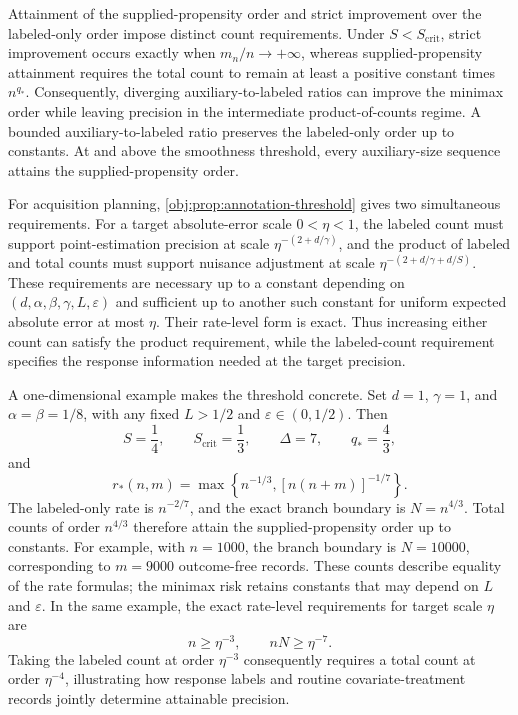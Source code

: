 \documentclass[11pt]{article}
\begin{document}
Attainment of the supplied-propensity order and strict improvement over the labeled-only order impose distinct count requirements. Under \(S<S_{\mathrm{crit}}\), strict improvement occurs exactly when \(m_n/n\to+\infty\), whereas supplied-propensity attainment requires the total count to remain at least a positive constant times \(n^{q_*}\). Consequently, diverging auxiliary-to-labeled ratios can improve the minimax order while leaving precision in the intermediate product-of-counts regime. A bounded auxiliary-to-labeled ratio preserves the labeled-only order up to constants. At and above the smoothness threshold, every auxiliary-size sequence attains the supplied-propensity order.

For acquisition planning, \cref{obj:prop:annotation-threshold} gives two simultaneous requirements. For a target absolute-error scale \(0<\eta<1\), the labeled count must support point-estimation precision at scale \(\eta^{-(2+d/\gamma)}\), and the product of labeled and total counts must support nuisance adjustment at scale \(\eta^{-(2+d/\gamma+d/S)}\). These requirements are necessary up to a constant depending on \((d,\alpha,\beta,\gamma,L,\varepsilon)\) and sufficient up to another such constant for uniform expected absolute error at most \(\eta\). Their rate-level form is exact. Thus increasing either count can satisfy the product requirement, while the labeled-count requirement specifies the response information needed at the target precision.

A one-dimensional example makes the threshold concrete. Set \(d=1\), \(\gamma=1\), and \(\alpha=\beta=1/8\), with any fixed \(L>1/2\) and \(\varepsilon\in(0,1/2)\). Then
\[
S=\frac14,\qquad
S_{\mathrm{crit}}=\frac13,\qquad
\Delta=7,\qquad
q_*=\frac43,
\]
and
\[
r_*(n,m)=\max\left\{n^{-1/3},[n(n+m)]^{-1/7}\right\}.
\]
The labeled-only rate is \(n^{-2/7}\), and the exact branch boundary is \(N=n^{4/3}\). Total counts of order \(n^{4/3}\) therefore attain the supplied-propensity order up to constants. For example, with \(n=1000\), the branch boundary is \(N=10000\), corresponding to \(m=9000\) outcome-free records. These counts describe equality of the rate formulas; the minimax risk retains constants that may depend on \(L\) and \(\varepsilon\). In the same example, the exact rate-level requirements for target scale \(\eta\) are
\[
n\ge\eta^{-3},
\qquad
nN\ge\eta^{-7}.
\]
Taking the labeled count at order \(\eta^{-3}\) consequently requires a total count at order \(\eta^{-4}\), illustrating how response labels and routine covariate-treatment records jointly determine attainable precision.
\end{document}
